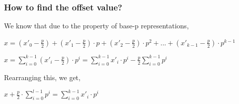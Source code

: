 \documentclass{report}
\begin{document}
	\subsubsection{How to find the offset value?}
	We know that due to the property of base-p representations,
	\begin{center}
		$x = (x'_0 - \frac{p}{2}) + (x'_1 - \frac{p}{2}) \cdot p + (x'_2 - \frac{p}{2})\cdot p^2 + ... + (x'_{k-1} - \frac{p}{2})\cdot p^{k-1}$ \newline
		
		$x = \sum\limits_{i=0}^{k-1} (x'_i - \frac{p}{2}) \cdot p^i  = \sum\limits_{i=0}^{k-1} x'_i \cdot p^i - \frac{p}{2} \sum\limits_{i=0}^{k-1} p^i$ 
	\end{center}
	
	Rearranging this, we get,
	\begin{center}
		$x + \frac{p}{2} \cdot \sum\limits_{i=0}^{l-1} p^i = \sum\limits_{i=0}^{k-1} x'_i \cdot p^i$
	\end{center}
	
\end{document}
